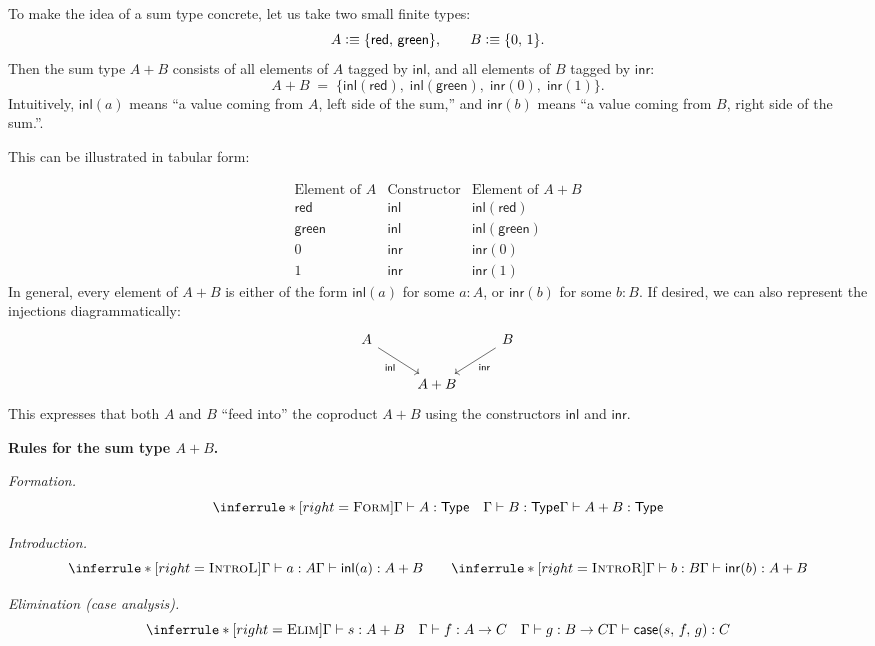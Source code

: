 \documentclass{article}
\newcommand{\Type}{\ensuremath{\mathsf{Type}}}
\newcommand{\defeq}{\vcentcolon\equiv}
\newcommand{\inl}{\mathsf{inl}}
\newcommand{\inr}{\mathsf{inr}}
\newcommand{\caseof}{\mathsf{case}}
\newcommand{\judg}[3]{#1 \vdash #2 : #3}   %
\newcommand{\rulename}[1]{\textsc{#1}}
\begin{document}
To make the idea of a sum type concrete, let us take two small finite types:
\[
A \defeq \{\mathsf{red},\, \mathsf{green}\}, 
\qquad
B \defeq \{0,\,1\}.
\]
Then the sum type \(A + B\) consists of all elements of \(A\) tagged by \(\inl\),
and all elements of \(B\) tagged by \(\inr\):
\[
A + B \;=\;
\{\inl(\mathsf{red}),\; \inl(\mathsf{green}),\;
  \inr(0),\; \inr(1)\}.
\]
Intuitively, \(\inl(a)\) means “a value coming from \(A\), left side of the sum,” and
\(\inr(b)\) means “a value coming from \(B\), right side of the sum.”. 

\bigskip
\noindent
This can be illustrated in tabular form:

\[
\begin{array}{c|c|c}
\text{Element of } A & \text{Constructor} & \text{Element of } A + B \\ \hline
\mathsf{red} & \inl & \inl(\mathsf{red}) \\
\mathsf{green} & \inl & \inl(\mathsf{green}) \\ \hline
0 & \inr & \inr(0) \\
1 & \inr & \inr(1)
\end{array}
\]
In general, every element of \(A + B\) is either of the form
\(\inl(a)\) for some \(a : A\), or \(\inr(b)\) for some \(b : B\). If desired, we can also represent the injections diagrammatically:
\[
\begin{tikzcd}
A \arrow[dr, "\inl"'] & & B \arrow[dl, "\inr"] \\
& A + B &
\end{tikzcd}
\]
This expresses that both \(A\) and \(B\) “feed into” the coproduct \(A + B\) using the constructors $\inl$ and $\inr$.

\medskip
\noindent\textbf{Rules for the sum type \(A + B\).}

\medskip
\noindent
\emph{Formation.}
\[
\inferrule*[right=\rulename{Form}]{
  \judg{\Gamma}{A}{\Type}
  \quad
  \judg{\Gamma}{B}{\Type}
}{
  \judg{\Gamma}{A + B}{\Type}
}
\]

\medskip
\noindent
\emph{Introduction.}
\[
\inferrule*[right=\rulename{IntroL}]{
  \judg{\Gamma}{a}{A}
}{
  \judg{\Gamma}{\inl(a)}{A + B}
}
\qquad
\inferrule*[right=\rulename{IntroR}]{
  \judg{\Gamma}{b}{B}
}{
  \judg{\Gamma}{\inr(b)}{A + B}
}
\]

\medskip
\noindent
\emph{Elimination (case analysis).}
\[
\inferrule*[right=\rulename{Elim}]{
  \judg{\Gamma}{s}{A + B}
  \quad
  \judg{\Gamma}{f}{A \to C}
  \quad
  \judg{\Gamma}{g}{B \to C}
}{
  \judg{\Gamma}{\caseof(s,\,f,\,g)}{C}
}
\]
\end{document}
